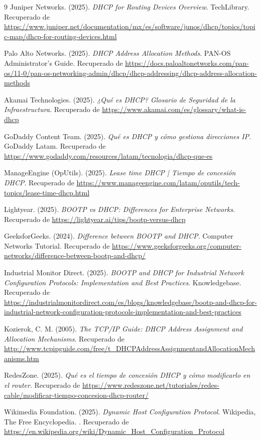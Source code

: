 \documentclass[a4paper,12pt]{article}
\begin{document}
\begin{thebibliography}{9}
     Juniper Networks. (2025). \textit{DHCP for Routing Devices Overview}. TechLibrary. Recuperado de \url{https://www.juniper.net/documentation/mx/es/software/junos/dhcp/topics/topic-map/dhcp-for-routing-devices.html}

     Palo Alto Networks. (2025). \textit{DHCP Address Allocation Methods}. PAN-OS Administrator's Guide. Recuperado de \url{https://docs.paloaltonetworks.com/pan-os/11-0/pan-os-networking-admin/dhcp/dhcp-addressing/dhcp-address-allocation-methods}

     Akamai Technologies. (2025). \textit{¿Qué es DHCP? Glosario de Seguridad de la Infraestructura}. Recuperado de \url{https://www.akamai.com/es/glossary/what-is-dhcp}

     GoDaddy Content Team. (2025). \textit{Qué es DHCP y cómo gestiona direcciones IP}. GoDaddy Latam. Recuperado de \url{https://www.godaddy.com/resources/latam/tecnologia/dhcp-que-es}

     ManageEngine (OpUtils). (2025). \textit{Lease time DHCP | Tiempo de concesión DHCP}. Recuperado de \url{https://www.manageengine.com/latam/oputils/tech-topics/lease-time-dhcp.html}

     Lightyear. (2025). \textit{BOOTP vs DHCP: Differences for Enterprise Networks}. Recuperado de \url{https://lightyear.ai/tips/bootp-versus-dhcp}
    
     GeeksforGeeks. (2024). \textit{Difference between BOOTP and DHCP}. Computer Networks Tutorial. Recuperado de \url{https://www.geeksforgeeks.org/computer-networks/difference-between-bootp-and-dhcp/}
    
     Industrial Monitor Direct. (2025). \textit{BOOTP and DHCP for Industrial Network Configuration Protocols: Implementation and Best Practices}. Knowledgebase. Recuperado de \url{https://industrialmonitordirect.com/es/blogs/knowledgebase/bootp-and-dhcp-for-industrial-network-configuration-protocols-implementation-and-best-practices}
    
     Kozierok, C. M. (2005). \textit{The TCP/IP Guide: DHCP Address Assignment and Allocation Mechanisms}. Recuperado de \url{http://www.tcpipguide.com/free/t_DHCPAddressAssignmentandAllocationMechanisms.htm}

     RedesZone. (2025). \textit{Qué es el tiempo de concesión DHCP y cómo modificarlo en el router}. Recuperado de \url{https://www.redeszone.net/tutoriales/redes-cable/modificar-tiempo-concesion-dhcp-router/}

     Wikimedia Foundation. (2025). \textit{Dynamic Host Configuration Protocol}. Wikipedia, The Free Encyclopedia. \textit{}. Recuperado de \url{https://en.wikipedia.org/wiki/Dynamic_Host_Configuration_Protocol}

\end{thebibliography}
\end{document}
